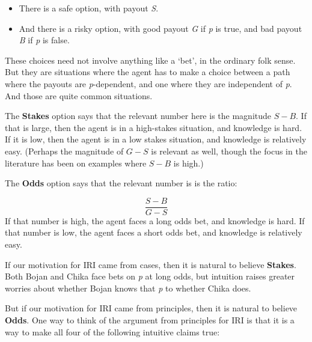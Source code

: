 \begin{itemize}
\item There is a safe option, with payout \emph{S}.

\item And there is a risky option, with good payout \emph{G} if \emph{p} is true, and bad payout \emph{B} if \emph{p} is false.

\end{itemize}
These choices need not involve anything like a `bet', in the ordinary folk sense. But they are situations where the agent has to make a choice between a path where the payouts are \emph{p}-dependent, and one where they are independent of \emph{p}. And those are quite common situations. 

The \textbf{Stakes} option says that the relevant number here is the magnitude $S-B$. If that is large, then the agent is in a high-stakes situation, and knowledge is hard. If it is low, then the agent is in a low stakes situation, and knowledge is relatively easy. (Perhaps the magnitude of $G-S$ is relevant as well, though the focus in the literature has been on examples where $S-B$ is high.)

The \textbf{Odds} option says that the relevant number is is the ratio:

$$\frac{S-B}{G-S}$$
If that number is high, the agent faces a long odds bet, and knowledge is hard. If that number is low, the agent faces a short odds bet, and knowledge is relatively easy.

If our motivation for IRI came from cases, then it is natural to believe \textbf{Stakes}. Both Bojan and Chika face bets on \emph{p} at long odds, but intuition raises greater worries about whether Bojan knows that \emph{p} to whether Chika does.

But if our motivation for IRI came from principles, then it is natural to believe \textbf{Odds}. One way to think of the argument from principles for IRI is that it is a way to make all four of the following intuitive claims true:

